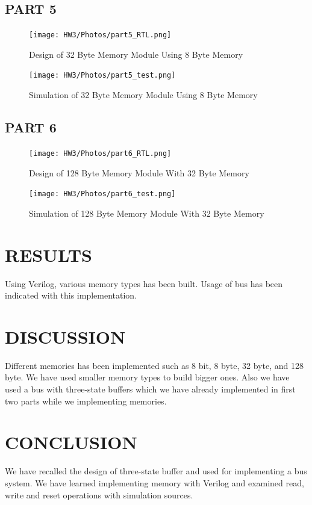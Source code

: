 \documentclass[pdftex,12pt,a4paper]{article}
\begin{document}
\subsection{PART 5}
\begin{figure}[ht]
	\centering
	\texttt{[image: HW3/Photos/part5\_RTL.png]}	
	\caption{Design of 32 Byte Memory Module Using 8 Byte Memory}
	\label{Part 5}
        \texttt{[image: HW3/Photos/part5\_test.png]}	
	\caption{Simulation of 32 Byte Memory Module Using 8 Byte Memory}
	\label{Part 5}
 
\end{figure}

\subsection{PART 6}
\begin{figure}[ht]
	\centering
	\texttt{[image: HW3/Photos/part6\_RTL.png]}	
	\caption{Design of 128 Byte Memory Module With 32 Byte Memory}
	\label{Part 6}
 	\texttt{[image: HW3/Photos/part6\_test.png]}	
	\caption{Simulation of 128 Byte Memory Module With 32 Byte Memory}
	\label{Part 6}
\end{figure}



\section{RESULTS}
Using Verilog, various memory types has been built. Usage of bus has been indicated with this implementation.

\section{DISCUSSION}
 Different memories has been implemented such as 8 bit, 8 byte, 32 byte, and 128 byte. We have used smaller memory types to build bigger ones. Also we have used a bus with three-state buffers which we have already implemented in first two parts while we implementing memories.

\section{CONCLUSION}
We have recalled the design of three-state buffer and used for implementing a bus system. We have learned implementing memory with Verilog and examined read, write and reset operations with simulation sources.

\newpage
{}



\end{document}
